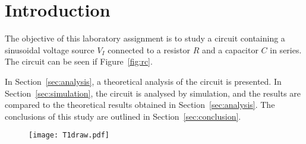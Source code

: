 \section{Introduction}
\label{sec:introduction}

The objective of this laboratory assignment is to study a circuit containing a
sinusoidal voltage source $V_I$ connected to a resistor $R$ and a capacitor $C$
in series. The circuit can be seen if Figure~\ref{fig:rc}.

\lipsum[1-1]

In Section~\ref{sec:analysis}, a theoretical analysis of the circuit is
presented. In Section~\ref{sec:simulation}, the circuit is analysed by
simulation, and the results are compared to the theoretical results obtained in
Section~\ref{sec:analysis}. The conclusions of this study are outlined in
Section~\ref{sec:conclusion}.

\begin{figure}
    \centering  
    \texttt{[image: T1draw.pdf]}
    \label{}
    \caption{}
\end{figure}


